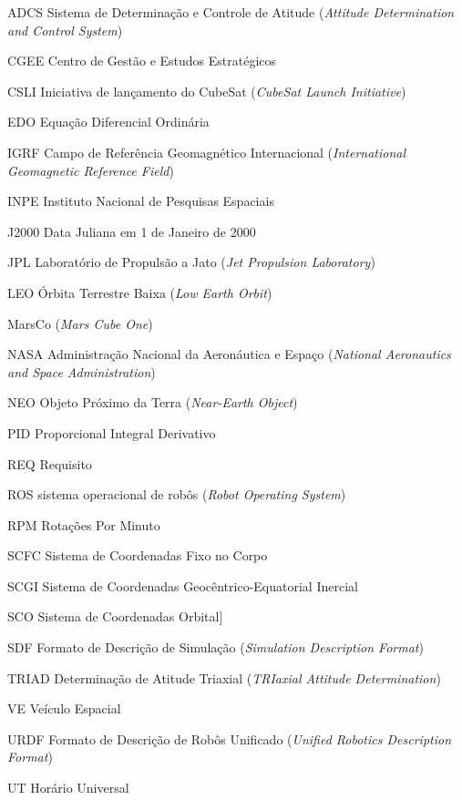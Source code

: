 \documentclass[
	12pt,					%
	openright,				%
	twoside,					%
	a4paper,					%
	english,					%
	brazil					%
	]{abntex2}
\numberwithin{equation}{subsection}
\begin{document}
\begin{siglas}
\item[ADCS] Sistema de Determinação e Controle de Atitude (\textit{Attitude Determination and Control System})
 \item[CGEE] Centro de Gestão e Estudos Estratégicos
 \item[CSLI] Iniciativa de lançamento do CubeSat  (\textit{CubeSat Launch Initiative})
 \item [EDO] Equação Diferencial Ordinária
 \item[IGRF] Campo de Referência Geomagnético Internacional (\textit{International Geomagnetic Reference Field})
  \item[INPE] Instituto Nacional de Pesquisas Espaciais
  \item[J2000] Data Juliana em 1 de Janeiro de 2000
  \item[JPL] Laboratório de Propulsão a Jato (\textit{Jet Propulsion Laboratory})
  \item[LEO] Órbita Terrestre Baixa (\textit{Low Earth Orbit})
 \item[MarsCo] (\textit{Mars Cube One})
  \item[NASA] Administração Nacional da Aeronáutica e Espaço (\textit{National Aeronautics and Space Administration})
  \item[NEO] Objeto Próximo da Terra (\textit{Near-Earth Object})  
  \item[PID] Proporcional Integral Derivativo
  \item[REQ] Requisito
  \item[ROS] sistema operacional de robôs (\textit{Robot Operating System})
  \item[RPM] Rotações Por Minuto
  \item[SCFC] Sistema de Coordenadas Fixo no Corpo
  \item[SCGI] Sistema de Coordenadas Geocêntrico-Equatorial Inercial
  \item[SCO] Sistema de Coordenadas Orbital]
  \item[SDF] Formato de Descrição de Simulação (\textit{Simulation Description Format})
  \item[TRIAD] Determinação de Atitude Triaxial (\textit{TRIaxial Attitude Determination})  
  \item[VE] Veículo Espacial  
  \item[URDF] Formato de Descrição de Robôs  Unificado (\textit{Unified Robotics Description Format}) 
  \item[UT] Horário Universal  
\end{siglas}
\end{document}
